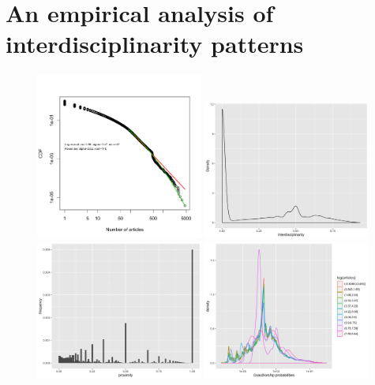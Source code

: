 \documentclass[utf8]{frontiersFPHY} %
\begin{document}
\section{An empirical analysis of interdisciplinarity patterns}


\begin{figure}
\includegraphics[width=0.49\textwidth]{figures/articlenum_fitDistrPowerLaw.png}
\includegraphics[width=0.49\textwidth]{figures/interdisciplinarity.png}\\
\includegraphics[width=0.49\textwidth]{figures/proximity.png}
\includegraphics[width=0.49\textwidth]{figures/collabprobas_byarticclenum.png}

\end{figure}
\end{document}
